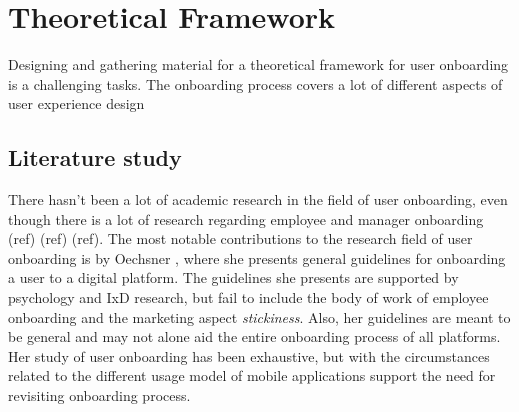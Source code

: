 

\chapter{Theoretical Framework}
\label{chap:theoretical_framework}
Designing and gathering material for a theoretical framework for user onboarding is a challenging tasks. The onboarding process covers a lot of different aspects of user experience design

\section{Literature study}
There hasn't been a lot of academic research in the field of user onboarding, even though there is a lot of research regarding employee and manager onboarding (ref) (ref) (ref). The most notable contributions to the research field of user onboarding is by Oechsner \cite{Oechsner2016}, where she presents general guidelines for onboarding a user to a digital platform. The guidelines she presents are supported by psychology and IxD research, but fail to include the body of work of employee onboarding and the marketing aspect \textit{stickiness}. Also, her guidelines are meant to be general and may not alone aid the entire onboarding process of all platforms. Her study of user onboarding has been exhaustive, but with the circumstances related to the different usage model of mobile applications support the need for revisiting onboarding process.

